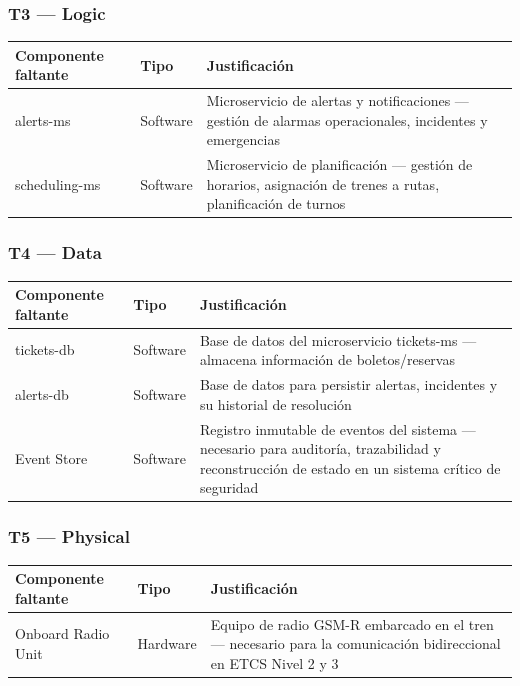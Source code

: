 \documentclass[a4paper, 10 pt]{article}
\begin{document}
\subsubsection{T3 --- Logic}

\begin{table}[H]
\centering
\footnotesize
\begin{tabular}{|R{0.18\textwidth}|M{0.1\textwidth}|R{0.52\textwidth}|}
\hline
\textbf{Componente faltante} & \textbf{Tipo} & \textbf{Justificación} \\
\hline
alerts-ms & Software & Microservicio de alertas y notificaciones --- gestión de alarmas operacionales, incidentes y emergencias \\
\hline
scheduling-ms & Software & Microservicio de planificación --- gestión de horarios, asignación de trenes a rutas, planificación de turnos \\
\hline
\end{tabular}
\end{table}

\subsubsection{T4 --- Data}

\begin{table}[H]
\centering
\footnotesize
\begin{tabular}{|R{0.18\textwidth}|M{0.1\textwidth}|R{0.52\textwidth}|}
\hline
\textbf{Componente faltante} & \textbf{Tipo} & \textbf{Justificación} \\
\hline
tickets-db & Software & Base de datos del microservicio tickets-ms --- almacena información de boletos/reservas \\
\hline
alerts-db & Software & Base de datos para persistir alertas, incidentes y su historial de resolución \\
\hline
Event Store & Software & Registro inmutable de eventos del sistema --- necesario para auditoría, trazabilidad y reconstrucción de estado en un sistema crítico de seguridad \\
\hline
\end{tabular}
\end{table}

\subsubsection{T5 --- Physical}

\begin{table}[H]
\centering
\footnotesize
\begin{tabular}{|R{0.18\textwidth}|M{0.1\textwidth}|R{0.52\textwidth}|}
\hline
\textbf{Componente faltante} & \textbf{Tipo} & \textbf{Justificación} \\
\hline
Onboard Radio Unit & Hardware & Equipo de radio GSM-R embarcado en el tren --- necesario para la comunicación bidireccional en ETCS Nivel 2 y 3 \\
\hline
\end{tabular}
\end{table}
\end{document}
